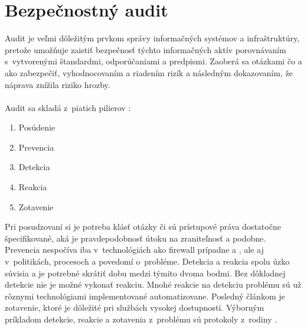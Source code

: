 \chapter{Bezpečnostný audit}
\label{bezpecnostny-audit}

Audit je veľmi dôležitým prvkom správy informačných systémov a infraštruktúry, pretože umožňuje zaistiť bezpečnosť týchto informačných aktív porovnávaním s~vytvorenými štandardmi, odporúčaniami a predpismi. Zaoberá sa otázkami čo a ako zabezpečiť, vyhodnocovaním a riadením rizík a následným dokazovaním, že náprava znížila riziko hrozby.
\\\\
\noindent
Audit sa skladá z~piatich pilierov \cite{Jackson2010}:

\begin{enumerate}
	\item Posúdenie
	\item Prevencia
	\item Detekcia
	\item Reakcia
	\item Zotavenie
\end{enumerate}

\vspace{1em}
\noindent
Pri posudzovaní si je potreba klásť otázky či sú prístupové práva dostatočne špecifikované, aká je pravdepodobnosť útoku na zraniteľnosť a podobne. Prevencia nespočíva iba v~technológiách ako firewall prípadne  a , ale aj v~politikách, procesoch a povedomí o~probléme. Detekcia a reakcia spolu úzko súvisia a je potrebné skrátiť dobu medzi týmito dvoma bodmi. Bez dôkladnej detekcie nie je možné vykonať reakciu.	Mnohé reakcie na detekciu problému sú už rôznymi technológiami implementované automatizovane. Posledný článkom je zotavenie, ktoré je dôležité pri službách vysokej dostupnosti. Výborným príkladom detekcie, reakcie a zotavenia z~problému sú protokoly z~rodiny .

